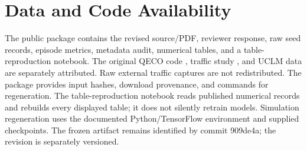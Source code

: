 \documentclass[conference]{IEEEtran}
\begin{document}
\section*{Data and Code Availability}
The public package \cite{StudyCode} contains the revised source/PDF, reviewer response, raw seed records, episode metrics, metadata audit, numerical tables, and a table-reproduction notebook. The original QECO code \cite{QECOCode}, traffic study \cite{Traffic}, and UCLM data \cite{UCLMData} are separately attributed. Raw external traffic captures are not redistributed. The package provides input hashes, download provenance, and commands for regeneration. The table-reproduction notebook reads published numerical records and rebuilds every displayed table; it does not silently retrain models. Simulation regeneration uses the documented Python/TensorFlow environment and supplied checkpoints. The frozen artifact remains identified by commit 909de4a; the revision is separately versioned.



\end{document}

